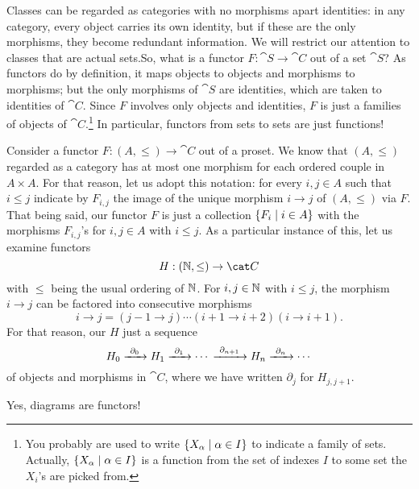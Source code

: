\begin{example}\label{example:CollectionsAreCats}
  Classes can be regarded as categories with no morphisms apart
  identities: in any category, every object carries its own identity,
  but if these are the only morphisms, they become redundant
  information. We will restrict our attention to classes that are
  actual sets.\newline So, what is a functor \(F : \cat S \to \cat C\)
  out of a set \(\cat S\)? As functors do by definition, it maps
  objects to objects and morphisms to morphisms; but the only
  morphisms of \(\cat S\) are identities, which are taken to
  identities of \(\cat C\). Since \(F\) involves only objects and
  identities, \(F\) is just a families of objects of
  \(\cat C\).\footnote{You probably are used to write
    \(\left\{X_\alpha \mid \alpha \in I\right\}\) to indicate a family of
    sets. Actually, \(\left\{X_\alpha \mid \alpha \in I\right\}\) is a function
    from the set of indexes \(I\) to some set the \(X_i\)'s are picked
    from.} In particular, functors from sets to sets are just
  functions!
\end{example}

\begin{example}
  Consider a functor \(F : (A, \le) \to \cat C\) out of a proset. We
  know that \((A, \le)\) regarded as a category has at most one
  morphism for each ordered couple in \(A \times A\). For that reason,
  let us adopt this notation: for every \(i, j \in A\) such that
  \(i \le j\) indicate by \(F_{i,j}\) the image of the unique morphism
  \(i \to j\) of \((A, \le)\) via \(F\). That being said, our functor
  \(F\) is just a collection \(\left\{F_i \mid i \in A\right\}\) with the
  morphisms \(F_{i,j}\)'s for \(i, j \in A\) with \(i \le j\).\newline
  As a particular instance of this, let us examine functors
  \[H : (\naturals, \le) \to \cat C\] with \(\le\) being the usual
  ordering of \(\mathbb N\). For \(i, j \in \mathbb N\) with
  \(i \le j\), the morphism \(i \to j\) can be factored into
  consecutive morphisms
  \[i \to j = (j-1 \to j) \cdots{} (i+1 \to i+2) (i \to i+1) .\] For
  that reason, our \(H\)  just a sequence
  \[H_0 \xrightarrow{\ \partial_0\ } H_1 \xrightarrow{\ \partial_1\ } \cdots{}
    \xrightarrow{\ \partial_{n+1}\ } H_n \xrightarrow{\ \partial_n\ } \cdots{}\] of
  objects and morphisms in \(\cat C\), where we have written
  \(\partial_j\) for \(H_{j, j+1}\).
\end{example}

\begin{exercise}
  Yes, diagrams are functors!
\end{exercise}

